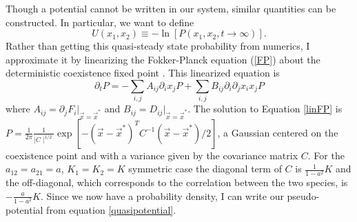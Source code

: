 Though a potential cannot be written in our system, similar quantities can be constructed. 
In particular, we want to define
\begin{equation}
U(x_1,x_2) \equiv -\ln\left[P(x_1,x_2,t\rightarrow\infty)\right].
\end{equation}
Rather than getting this quasi-steady state probability from numerics, I approximate it by linearizing the Fokker-Planck equation (\ref{FP}) about the deterministic coexistence fixed point \cite{VanKampen1992}. 
This linearized equation is
\begin{equation}
\partial_t P = -\sum_{i,j} A_{ij}\partial_i x_j P + \sum_{i,j} B_{ij} \partial_i\partial_j x_i x_j P
\end{equation}
where $A_{ij}=\partial_j F_i \lvert_{\vec{x}=\vec{x}^*}$ and $B_{ij}=D_{ij} \lvert_{\vec{x}=\vec{x}^*}$. 
The solution to Equation \ref{linFP} is $P=\frac{1}{2\pi}\frac{1}{\mid C\mid^{1/2}}\exp[-(\vec{x} - \vec{x}^*)^T C^{-1}(\vec{x} - \vec{x}^*)/2]$, a Gaussian centered on the coexistence point and with a variance given by the covariance matrix $C$. 
For the $a_{12}=a_{21}=a$, $K_1=K_2=K$ symmetric case the diagonal term of $C$ is $\frac{1}{1-a^2}K$ and the off-diagonal, which corresponds to the correlation between the two species, is $-\frac{a}{1-a^2}K$. 
Since we now have a probability density, I can write our pseudo-potential from equation \ref{quasipotential}. 

